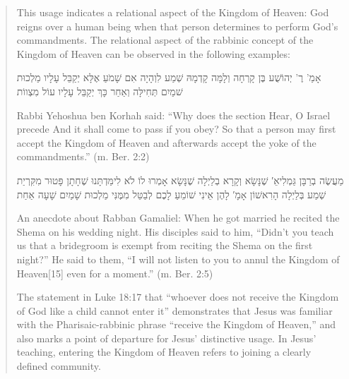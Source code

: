 \documentclass[11pt]{article}
\begin{document}
\begin{quote}
 This usage indicates a relational aspect of the Kingdom of Heaven: God reigns over a human being when that person determines to perform God’s commandments. The relational aspect of the rabbinic concept of the Kingdom of Heaven can be observed in the following examples: 
 
\begin{hebrew}
אָמַ' רֶ' יְהוֹשֻׁע בֶּן קָרְחָה וְלָמָּה קָדְמָהּ שְׁמַע לִוְהָיָה אִם שָׁמֹעַ אֶלָּא יְקַבֵּל עָלָיו מַלְכוּת שׁמַיִם תְּחִילָּה וְאַחַר כָּךְ יְקַבֵּל עָלָיו עוֹל מִצְווֹת
\end{hebrew}

Rabbi Yehoshua ben Korhah said: “Why does the section Hear, O Israel precede And it shall come to pass if you obey? So that a person may first accept the Kingdom of Heaven and afterwards accept the yoke of the commandments.” (m. Ber. 2:2)

\begin{hebrew}
מַעֲשֶׂה בְרַבָּן גַּמְלִיאֵ′ שֶׁנָּשָׂא וְקָרָא בְלַיְלָה שֶׁנָּשָׂא אָמְרוּ לוֹ לֹא לִימַּדְתָּנוּ שֶׁחָתָן פָּטוּר מִקִּרְיַת שְׁמַע בְּלַיְלָה הָרִאשׁוֹן אָמָ′ לָהֶן אֵינִי שׁוֹמֵעַ לָכֶם לְבַטֵּל מִמֶּנִּי מַלְכוּת שָׁמַיִם שָׁעָה אַחַת
\end{hebrew}

An anecdote about Rabban Gamaliel: When he got married he recited the Shema on his wedding night. His disciples said to him, “Didn’t you teach us that a bridegroom is exempt from reciting the Shema on the first night?” He said to them, “I will not listen to you to annul the Kingdom of Heaven[15] even for a moment.” (m. Ber. 2:5)

The statement in Luke 18:17 that “whoever does not receive the Kingdom of God like a child cannot enter it” demonstrates that Jesus was familiar with the Pharisaic-rabbinic phrase “receive the Kingdom of Heaven,” and also marks a point of departure for Jesus’ distinctive usage. In Jesus’ teaching, entering the Kingdom of Heaven refers to joining a clearly defined community. \cite{kingdom of heaven jp}
\end{quote}
\end{document}
